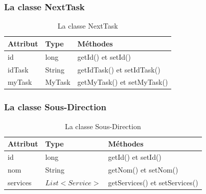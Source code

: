 \subsubsection{La classe NextTask}
\begin{table}[H]
	\centering\setlength\tabcolsep{1cm}
	
	\begin{tabular}{|l|l|l|}
		\hline
		\textbf{Attribut}  & \textbf{Type} & \multicolumn{1}{l|}{\textbf{Méthodes}} \\ \hline
		
		id & long & getId() et setId()\\ \cline{1-2}
		idTask & String & getIdTask() et setIdTask()\\ \cline{1-2}
		myTask & MyTask  & getMyTask() et setMyTask()   \\ \hline
	\end{tabular}
	\caption{La classe NextTask}
	\label{fig:class5}
\end{table}






\subsubsection{La classe  Sous-Direction}
\begin{table}[H]
	\centering\setlength\tabcolsep{0.8cm}
	\begin{tabular}{|l|l|l|}
		\hline
		\textbf{Attribut}  & \textbf{Type} & \multicolumn{1}{l|}{\textbf{Méthodes}} \\ \hline
		
		id & long & getId() et setId()\\ \cline{1-2}
		nom & String  & getNom() et setNom() \\ \cline{1-2}
		services	& $ List<Service> $ & getServices() et setServices()   \\ \hline
	\end{tabular}	\caption{La classe Sous-Direction}
	\label{fig:class1}
\end{table}


